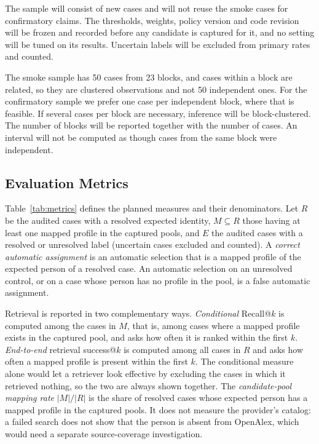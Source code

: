 The sample will consist of new cases and will not reuse the smoke cases for confirmatory claims. The thresholds, weights, policy version and code revision will be frozen and recorded before any candidate is captured for it, and no setting will be tuned on its results. Uncertain labels will be excluded from primary rates and counted.

The smoke sample has 50 cases from 23 blocks, and cases within a block are related, so they are clustered observations and not 50 independent ones. For the confirmatory sample we prefer one case per independent block, where that is feasible. If several cases per block are necessary, inference will be block-clustered. The number of blocks will be reported together with the number of cases. An interval will not be computed as though cases from the same block were independent.

\subsection{Evaluation Metrics}
\label{sec:metrics}
Table~\ref{tab:metrics} defines the planned measures and their denominators. Let $R$ be the audited cases with a resolved expected identity, $M\subseteq R$ those having at least one mapped profile in the captured pools, and $E$ the audited cases with a resolved or unresolved label (uncertain cases excluded and counted). A \emph{correct automatic assignment} is an automatic selection that is a mapped profile of the expected person of a resolved case. An automatic selection on an unresolved control, or on a case whose person has no profile in the pool, is a false automatic assignment.

Retrieval is reported in two complementary ways. \emph{Conditional} Recall@$k$ is computed among the cases in $M$, that is, among cases where a mapped profile exists in the captured pool, and asks how often it is ranked within the first $k$. \emph{End-to-end} retrieval success@$k$ is computed among all cases in $R$ and asks how often a mapped profile is present within the first $k$. The conditional measure alone would let a retriever look effective by excluding the cases in which it retrieved nothing, so the two are always shown together. The \emph{candidate-pool mapping rate} $|M|/|R|$ is the share of resolved cases whose expected person has a mapped profile in the captured pools. It does not measure the provider's catalog: a failed search does not show that the person is absent from OpenAlex, which would need a separate source-coverage investigation.


